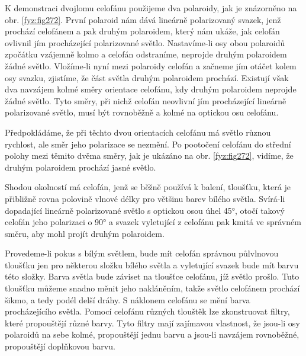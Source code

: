     K demonstraci dvojlomu celofánu použijeme dva polaroidy, jak je znázorněno na obr.
    \ref{fyz:fig272}. První polaroid nám dává lineárně polarizovaný svazek, jenž prochází celofánem
    a pak druhým polaroidem, který nám ukáže, jak celofán ovlivnil jím procházející polarizované
    světlo. Nastavíme-li osy obou polaroidů zpočátku vzájemně kolmo a celofán odstraníme, neprojde
    druhým polaroidem žádné světlo. Vložíme-li nyní mezi polaroidy celofán a začneme jím otáčet
    kolem osy svazku, zjistíme, že část světla druhým polaroidem prochází. Existují však dva
    navzájem kolmé směry orientace celofánu, kdy druhým polaroidem neprojde žádné světlo. Tyto
    směry, při nichž celofán neovlivní jím procházející lineárně polarizované světlo, musí být
    rovnoběžně a kolmé na optickou osu celofánu.

    Předpokládáme, že při těchto dvou orientacích celofánu má světlo různou rychlost, ale směr jeho
    polarizace se nezmění. Po pootočení celofánu do střední polohy mezi těmito dvěma směry, jak je
    ukázáno na obr. \ref{fyz:fig272}, vidíme, že druhým polaroidem prochází jasné světlo.

    Shodou okolností má celofán, jenž se běžně používá k balení, tloušťku, která je přibližně
    rovna polovině vlnové délky pro většinu barev bílého světla. Svírá-li dopadající lineárně
    polarizované světlo s optickou osou úhel \ang{45}, otočí takový celofán jeho polarizaci o
    \ang{90} a svazek vyletující z celofánu pak kmitá ve správném směru, aby mohl projít druhým
    polaroidem.

    Provedeme-li pokus s bílým světlem, bude mít celofán správnou půlvlnovou tloušťku jen pro
    některou složku bílého světla a vyletující svazek bude mít barvu této složky. Barva světla bude
    záviset na tloušťce celofánu, jíž světlo prošlo. Tuto tloušťku můžeme snadno měnit jeho
    nakláněním, takže světlo celofánem prochází šikmo, a tedy podél delší dráhy. S náklonem celofánu
    se mění barva procházejícího světla. Pomocí celofánu různých tlouštěk lze zkonstruovat ﬁltry,
    které propouštějí různé barvy. Tyto ﬁltry mají zajímavou vlastnost, že jsou-li osy polaroidů na
    sebe kolmé, propouštějí jednu barvu a jsou-li navzájem rovnoběžné, propouštějí doplňkovou barvu.

